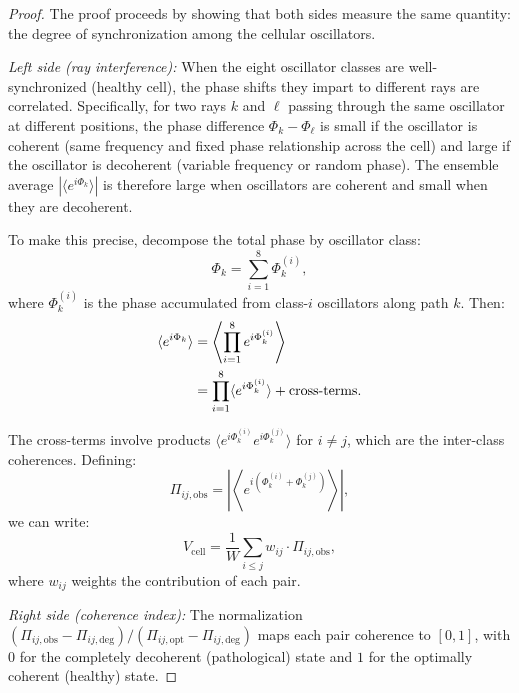 \documentclass[11pt,twocolumn,a4paper]{article}
\newcommand{\Vcell}{V_{\mathrm{cell}}}
\begin{document}
\begin{proof}
The proof proceeds by showing that both sides measure the same
quantity: the degree of synchronization among the cellular oscillators.

\textit{Left side (ray interference):} When the eight oscillator
classes are well-synchronized (healthy cell), the phase shifts they
impart to different rays are correlated. Specifically, for two rays
$k$ and $\ell$ passing through the same oscillator at different
positions, the phase difference $\Phi_k - \Phi_\ell$ is small if the
oscillator is coherent (same frequency and fixed phase relationship
across the cell) and large if the oscillator is decoherent (variable
frequency or random phase). The ensemble average
$|\langle e^{i\Phi_k} \rangle|$ is therefore large when oscillators
are coherent and small when they are decoherent.

To make this precise, decompose the total phase by oscillator class:
\begin{equation}
\Phi_k = \sum_{i=1}^{8} \Phi_k^{(i)},
\end{equation}
where $\Phi_k^{(i)}$ is the phase accumulated from class-$i$
oscillators along path $k$. Then:
\begin{align}
\langle e^{i\Phi_k} \rangle &= \left\langle
  \prod_{i=1}^{8} e^{i\Phi_k^{(i)}} \right\rangle \notag \\
  &= \prod_{i=1}^{8} \langle e^{i\Phi_k^{(i)}} \rangle
  + \text{cross-terms}.
\label{eq:phase-decomposition}
\end{align}

The cross-terms involve products
$\langle e^{i\Phi_k^{(i)}} e^{i\Phi_k^{(j)}} \rangle$ for $i \neq j$,
which are the inter-class coherences. Defining:
\begin{equation}
\Pi_{ij,\mathrm{obs}} = \left| \left\langle e^{i(\Phi_k^{(i)} +
  \Phi_k^{(j)})} \right\rangle \right|,
\end{equation}
we can write:
\begin{equation}
\Vcell = \frac{1}{W} \sum_{i \leq j} w_{ij} \cdot \Pi_{ij,\mathrm{obs}},
\end{equation}
where $w_{ij}$ weights the contribution of each pair.

\textit{Right side (coherence index):} The normalization
$(\Pi_{ij,\mathrm{obs}} - \Pi_{ij,\mathrm{deg}}) /
(\Pi_{ij,\mathrm{opt}} - \Pi_{ij,\mathrm{deg}})$ maps each pair
coherence to $[0,1]$, with $0$ for the completely decoherent
(pathological) state and $1$ for the optimally coherent (healthy)
state.


\end{proof}
\end{document}
